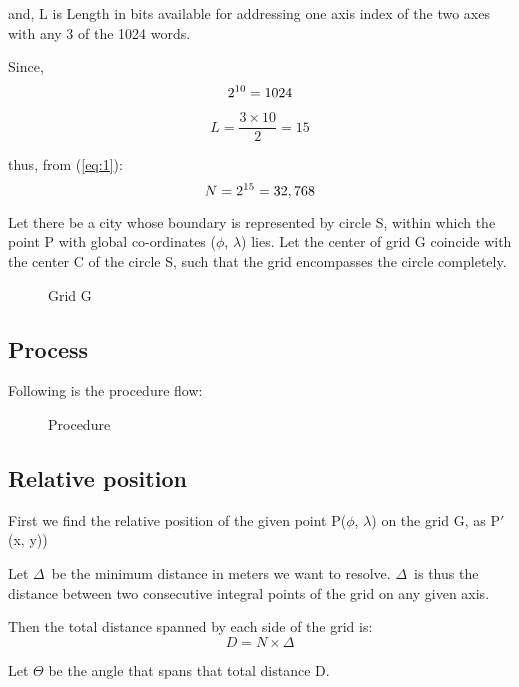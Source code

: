 \documentclass[conference]{IEEEtran}
\begin{document}
and, L is Length in bits available for addressing one axis index of the two axes with any 3 of the 1024 words.

Since, \begin{equation} 2\textsuperscript{10} = 1024 \end{equation}

\begin{equation} L = \frac {3 \times 10} {2} = 15 \end{equation}

thus, from (\ref{eq:1}):
\begin{equation} \label{eq:4} N = 2\textsuperscript{15} = 32,768 \end{equation}

Let there be a city whose boundary is represented by circle S, within which the point P with global co-ordinates ($\phi$, $\lambda$) lies. Let the center of grid G coincide with the center C of the circle S, such that the grid encompasses the circle completely.

\begin{figure}[H]
\centerline{}
\caption{Grid G}
\label{Grid}
\end{figure}

\subsection{Process} Following is the procedure flow:

\begin{figure}[H]
\centerline{}
\caption{Procedure}
\label{Procedure}
\end{figure}

\subsection{Relative position} First we find the relative position of the given point P($\phi$, $\lambda$) on the grid G, as P$'$(x, y))

Let $\Delta$\ be the minimum distance in meters we want to resolve.
$\Delta$\ is thus the distance between two consecutive integral points of the grid on any given axis.

Then the total distance spanned by each side of the grid is:
\begin{equation}D = N \times \Delta\end{equation}

Let $\Theta$ be the angle that spans that total distance D.
\end{document}
